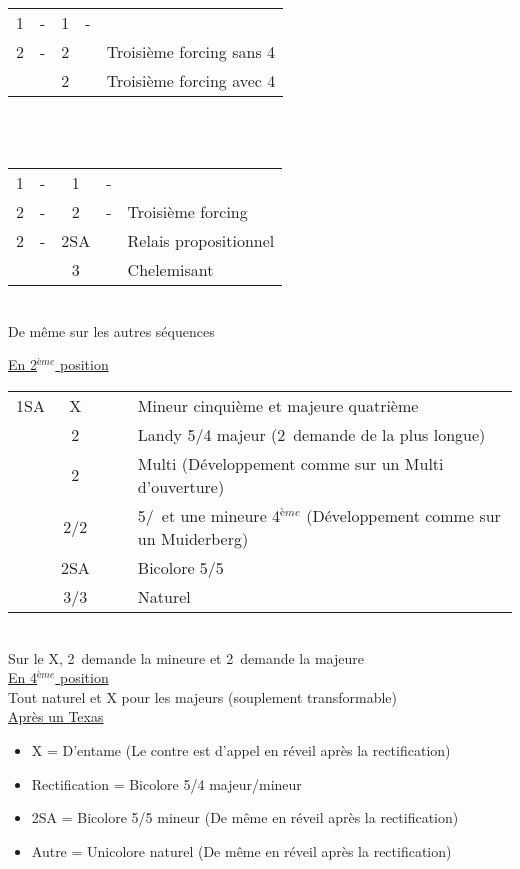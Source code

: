 \documentclass[a4paper, oneside, 11pt]{report}
\begin{document}
	\begin{tabular}{cccc|l}
	1\trefle & - & 1\pique & - &\\
	2\trefle & - & 2\carreau && Troisième forcing sans 4\coeur\\
	&& 2\coeur && Troisième forcing avec 4\coeur\\
	\end{tabular}\\\\
		
	\begin{tabular}{cccc|l}
	1\trefle & - & 1\coeur & - &\\
	2\trefle & - & 2\carreau & - & Troisième forcing\\
	2\coeur & - & 2SA && Relais propositionnel\\
	&& 3\coeur &&Chelemisant\\
	\end{tabular}\\
	De même sur les autres séquences

	\underline{En 2$^{ème}$ position}
	
	\begin{tabular}{cccc|l}
	1SA & X &&& Mineur cinquième et majeure quatrième\\
	& 2\trefle &&& Landy 5/4 majeur (2\carreau\ demande de la plus longue)\\
	& 2\carreau &&& Multi (Développement comme sur un Multi d'ouverture)\\
	& 2\coeur/2\pique &&& 5\coeur/\pique\ et une mineure 4$^{ème}$ (Développement comme sur un Muiderberg)\\
	& 2SA &&& Bicolore 5\trefle/5\carreau\\
	& 3\trefle/3\carreau &&& Naturel\\
	\end{tabular}\\
	Sur le X, 2\trefle\ demande la mineure et 2\carreau\ demande la majeure\\
	
	\underline{En 4$^{ème}$ position}\\
	Tout naturel et X pour les majeurs (souplement transformable)\\

	\underline{Après un Texas}
	
	\begin{itemize}
	\item X = D'entame (Le contre est d'appel en réveil après la rectification)
	\item Rectification = Bicolore 5/4 majeur/mineur
	\item 2SA = Bicolore 5/5 mineur (De même en réveil après la rectification)
	\item Autre = Unicolore naturel (De même en réveil après la rectification)\\
	\end{itemize}
\end{document}
